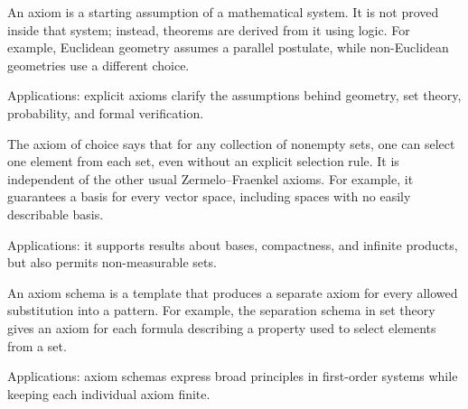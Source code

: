 An axiom is a starting assumption of a mathematical system. It is not proved inside that system; instead, theorems are derived from it using logic. For example, Euclidean geometry assumes a parallel postulate, while non-Euclidean geometries use a different choice. \par\noindent Applications: explicit axioms clarify the assumptions behind geometry, set theory, probability, and formal verification.

The axiom of choice says that for any collection of nonempty sets, one can select one element from each set, even without an explicit selection rule. It is independent of the other usual Zermelo--Fraenkel axioms. For example, it guarantees a basis for every vector space, including spaces with no easily describable basis. \par\noindent Applications: it supports results about bases, compactness, and infinite products, but also permits non-measurable sets.

An axiom schema is a template that produces a separate axiom for every allowed substitution into a pattern. For example, the separation schema in set theory gives an axiom for each formula describing a property used to select elements from a set. \par\noindent Applications: axiom schemas express broad principles in first-order systems while keeping each individual axiom finite.
